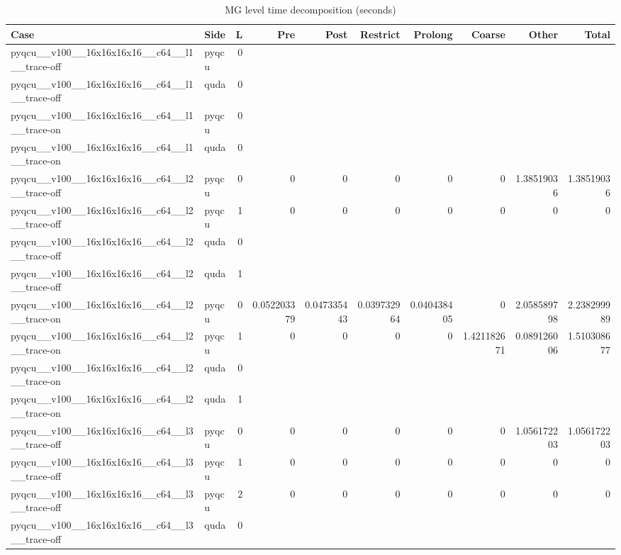 
\begin{table}[htbp]
\centering
\caption{MG level time decomposition (seconds)}
\small
\begin{tabular}{@{}llrrrrrrrr@{}}
\toprule
Case & Side & L & Pre & Post & Restrict & Prolong & Coarse & Other & Total \\
\midrule
pyqcu\_\_v100\_\_16x16x16x16\_\_c64\_\_l1\_\_trace-off & pyqcu & 0 &  &  &  &  &  &  &  \\
pyqcu\_\_v100\_\_16x16x16x16\_\_c64\_\_l1\_\_trace-off & quda & 0 &  &  &  &  &  &  &  \\
pyqcu\_\_v100\_\_16x16x16x16\_\_c64\_\_l1\_\_trace-on & pyqcu & 0 &  &  &  &  &  &  &  \\
pyqcu\_\_v100\_\_16x16x16x16\_\_c64\_\_l1\_\_trace-on & quda & 0 &  &  &  &  &  &  &  \\
pyqcu\_\_v100\_\_16x16x16x16\_\_c64\_\_l2\_\_trace-off & pyqcu & 0 & 0 & 0 & 0 & 0 & 0 & 1.38519036 & 1.38519036 \\
pyqcu\_\_v100\_\_16x16x16x16\_\_c64\_\_l2\_\_trace-off & pyqcu & 1 & 0 & 0 & 0 & 0 & 0 & 0 & 0 \\
pyqcu\_\_v100\_\_16x16x16x16\_\_c64\_\_l2\_\_trace-off & quda & 0 &  &  &  &  &  &  &  \\
pyqcu\_\_v100\_\_16x16x16x16\_\_c64\_\_l2\_\_trace-off & quda & 1 &  &  &  &  &  &  &  \\
pyqcu\_\_v100\_\_16x16x16x16\_\_c64\_\_l2\_\_trace-on & pyqcu & 0 & 0.052203379 & 0.047335443 & 0.039732964 & 0.040438405 & 0 & 2.058589798 & 2.238299989 \\
pyqcu\_\_v100\_\_16x16x16x16\_\_c64\_\_l2\_\_trace-on & pyqcu & 1 & 0 & 0 & 0 & 0 & 1.421182671 & 0.089126006 & 1.510308677 \\
pyqcu\_\_v100\_\_16x16x16x16\_\_c64\_\_l2\_\_trace-on & quda & 0 &  &  &  &  &  &  &  \\
pyqcu\_\_v100\_\_16x16x16x16\_\_c64\_\_l2\_\_trace-on & quda & 1 &  &  &  &  &  &  &  \\
pyqcu\_\_v100\_\_16x16x16x16\_\_c64\_\_l3\_\_trace-off & pyqcu & 0 & 0 & 0 & 0 & 0 & 0 & 1.056172203 & 1.056172203 \\
pyqcu\_\_v100\_\_16x16x16x16\_\_c64\_\_l3\_\_trace-off & pyqcu & 1 & 0 & 0 & 0 & 0 & 0 & 0 & 0 \\
pyqcu\_\_v100\_\_16x16x16x16\_\_c64\_\_l3\_\_trace-off & pyqcu & 2 & 0 & 0 & 0 & 0 & 0 & 0 & 0 \\
pyqcu\_\_v100\_\_16x16x16x16\_\_c64\_\_l3\_\_trace-off & quda & 0 &  &  &  &  &  &  &  \\

\end{tabular}
\end{table}
